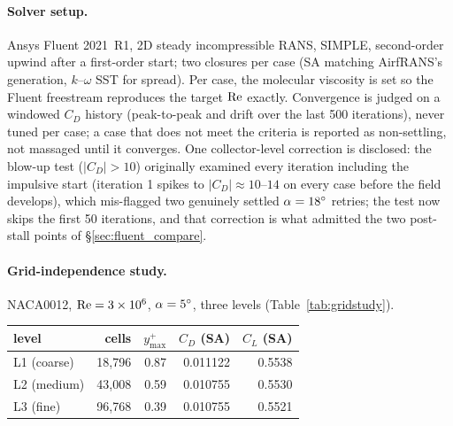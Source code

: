 \paragraph{Solver setup.} Ansys Fluent 2021~R1, 2D steady incompressible
RANS, SIMPLE, second-order upwind after a first-order start; two closures per
case (SA matching AirfRANS's generation, $k$--$\omega$ SST for spread). Per
case, the molecular viscosity is set so the Fluent freestream reproduces the
target $\mathrm{Re}$ exactly. Convergence is judged on a windowed $C_D$ history
(peak-to-peak and drift over the last 500 iterations), never tuned per case;
a case that does not meet the criteria is reported as non-settling, not
massaged until it converges. One collector-level correction is disclosed: the
blow-up test ($|C_D|>10$) originally examined every iteration including the
impulsive start (iteration 1 spikes to $|C_D|\approx10$--$14$ on every case
before the field develops), which mis-flagged two genuinely settled
$\alpha=18^{\circ}$ retries; the test now skips the first 50 iterations, and
that correction is what admitted the two post-stall points of
\S\ref{sec:fluent_compare}.

\paragraph{Grid-independence study.} NACA0012, $\Rey=3\times10^6$,
$\aoa=5\degrees$, three levels (Table~\ref{tab:gridstudy}).

\begin{widetable}
  \caption{Grid-independence study: NACA0012, $\Rey=3\times10^6$,
    $\aoa=5\degrees$, SA closure.}
  \label{tab:gridstudy}
  \tblfont
  \begin{tabular}{lrrrr}
    \toprule
    level & cells & $y^+_{\max}$ & $C_D$ (SA) & $C_L$ (SA) \\
    \midrule
    L1 (coarse) & 18{,}796 & 0.87 & 0.011122 & 0.5538 \\
    L2 (medium) & 43{,}008 & 0.59 & 0.010755 & 0.5530 \\
    L3 (fine)   & 96{,}768 & 0.39 & 0.010755 & 0.5521 \\
    \bottomrule
  \end{tabular}
\end{widetable}

